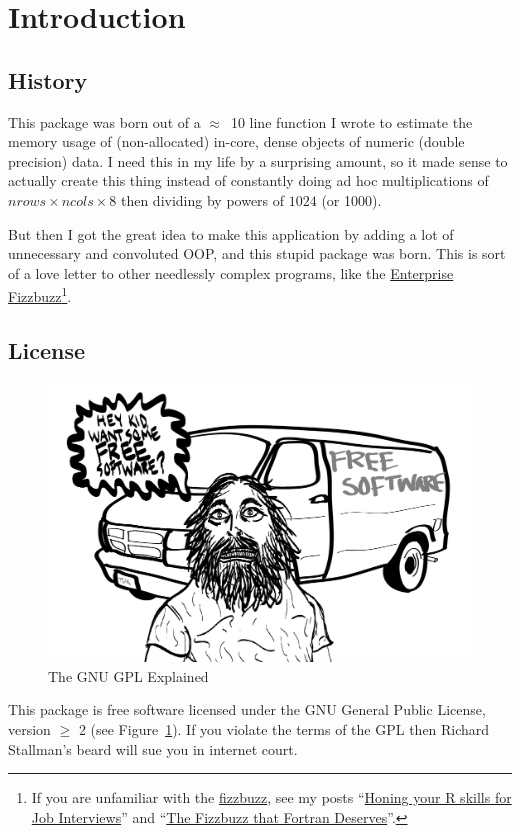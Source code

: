 \section{Introduction}

\subsection{History}

This package was born out of a $\approx$~10 line function I wrote to estimate the memory usage of (non-allocated) in-core, dense  objects of numeric (double precision) data.  I need this in my life by a surprising amount, so it made sense to actually create this thing instead of constantly doing ad hoc multiplications of $nrows\times ncols \times 8$ then dividing by powers of $1024$ (or 1000).

But then I got the great idea to make this application  by adding a lot of unnecessary and convoluted OOP, and this stupid package was born.  This is sort of a love letter to other needlessly complex programs, like the \href{https://github.com/Mikkeren/FizzBuzzEnterpriseEdition}{Enterprise Fizzbuzz}\footnote{If you are unfamiliar with the \href{https://en.wikipedia.org/wiki/Bizz_buzz}{fizzbuzz}, see my posts ``\href{http://librestats.com/2012/01/10/honing-your-r-skills-for-job-interviews/}{Honing your R skills for Job Interviews}'' and ``\href{http://librestats.com/2013/04/26/the-fizzbuzz-that-fortran-deserves/}{The Fizzbuzz that Fortran Deserves}''.}.



\subsection{License}

\begin{figure}[th]
  \centering
  \includegraphics[scale=.35]{./include/gpl.png}
  \caption{The GNU GPL Explained}
  \label{fig:gnu}
\end{figure}
This package is free software licensed under the GNU General Public License, version $\geq$ 2 (see Figure~\ref{fig:gnu}).
If you violate the terms of the GPL then Richard Stallman's beard will sue you in internet court.
